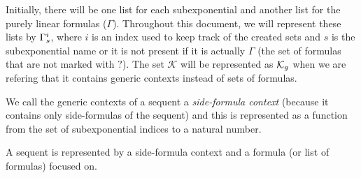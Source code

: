 Initially, there will be one list for each subexponential and another list for
the purely linear formulas ($\Gamma$). Throughout this document, we will
represent these lists by $\Gamma_{s}^{i}$, where $i$ is an index used to keep track
of the created sets and $s$ is the subexponential name or it
is not present if it is actually $\Gamma$ (the set of formulas that are not marked with
$?$). The set $\mathcal{K}$ will be represented as $\mathcal{K}_{g}$ when we are refering
that it contains generic contexts instead of sets of formulas.

We call the generic contexts of a sequent a \textit{side-formula context} (because it
contains only side-formulas of the sequent) and this is represented as a
function from the set of subexponential indices to a natural number.


A sequent is represented by a side-formula context and a formula (or list of
formulas) focused on.

